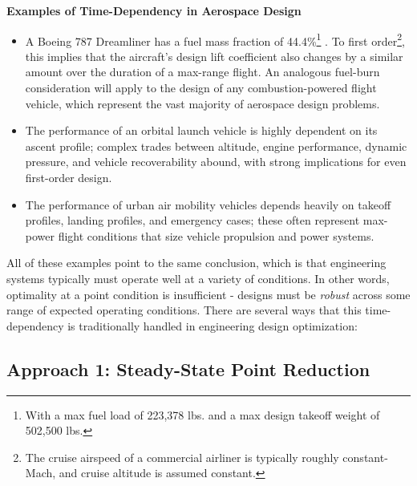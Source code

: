 \begin{example}
    \textbf{Examples of Time-Dependency in Aerospace Design}
    \begin{itemize}
        \item A Boeing 787 Dreamliner has a fuel mass fraction of 44.4\%\footnote{With a max fuel load of 223,378 lbs. and a max design takeoff weight of 502,500 lbs.} \cite{boeing787stats}. To first order\footnote{The cruise airspeed of a commercial airliner is typically roughly constant-Mach, and cruise altitude is assumed constant.}, this implies that the aircraft's design lift coefficient also changes by a similar amount over the duration of a max-range flight. An analogous fuel-burn consideration will apply to the design of any combustion-powered flight vehicle, which represent the vast majority of aerospace design problems.
        \item The performance of an orbital launch vehicle is highly dependent on its ascent profile; complex trades between altitude, engine performance, dynamic pressure, and vehicle recoverability abound, with strong implications for even first-order design.
        \item The performance of urban air mobility vehicles depends heavily on takeoff profiles, landing profiles, and emergency cases; these often represent max-power flight conditions that size vehicle propulsion and power systems.
    \end{itemize} %
\end{example}

All of these examples point to the same conclusion, which is that engineering systems typically must operate well at a variety of conditions. In other words, optimality at a point condition is insufficient - designs must be \textit{robust} across some range of expected operating conditions. There are several ways that this time-dependency is traditionally handled in engineering design optimization:

\subsection{Approach 1: Steady-State Point Reduction}

